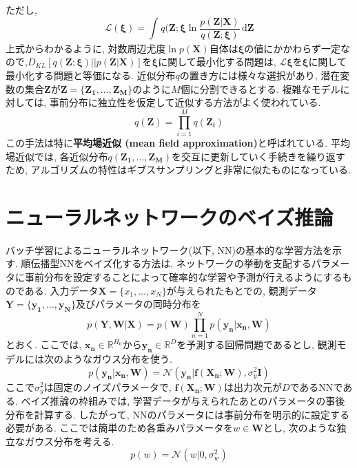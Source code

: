 \documentclass[twocolumn]{jarticle}
\begin{document}
ただし,
\begin{equation}
  \mathcal{L}(\bm {\xi}) = \int_{}^{} q(\bm {Z;\xi}\ln\frac{p(\bm {Z|X})}{q(\bm {Z;\xi})} \,\mathrm{d}{\bm {Z}}
\end{equation}
上式からわかるように, 対数周辺尤度${\ln p(\bm {X})}$自体は${\bm {\xi}}$の値にかかわらず一定なので,${D_{KL}[q(\bm {Z;\xi})||p(\bm {Z|X})]}$を${\bm {\xi}}$に関して最小化する問題は, ${\mathcal{L} {\bm {\xi}}}$を${\bm {\xi}}$に関して最小化する問題と等価になる. 近似分布${q}$の置き方には様々な選択があり, 潜在変数の集合${\bm {Z}}$が${\bm {Z} = \{ \bm{Z_1, \ldots, Z_M}\}}$のように${M}$個に分割できるとする. 複雑なモデルに対しては, 事前分布に独立性を仮定して近似する方法がよく使われている.
\begin{equation}
  q(\bm {Z}) = \prod_{i=1}^{M} q(\bm {Z_i})
\end{equation}
この手法は特に{\bf 平均場近似 (mean field approximation)}と呼ばれている. 平均場近似では, 各近似分布${q(\bm {Z_1}, \ldots, \bm {Z_M})}$を交互に更新していく手続きを繰り返すため, アルゴリズムの特性はギブスサンプリングと非常に似たものになっている.

\section{ニューラルネットワークのベイズ推論}
バッチ学習によるニューラルネットワーク(以下, NN)の基本的な学習方法を示す. 順伝播型NNをベイズ化する方法は, ネットワークの挙動を支配するパラメータに事前分布を設定することによって確率的な学習や予測が行えるようにするものである.
入力データ${\bm {X} = \{x_1, \ldots, x_N\}}$が与えられたもとでの, 観測データ${\bm {Y} = \{\bm {y_1, \ldots, y_N}\}}$及びパラメータの同時分布を
\begin{equation}
  p(\bm {Y, W| X}) = p(\bm {W})\prod_{n=1}^{N} p(\bm {y_n|x_n, W})
\end{equation}
とおく. ここでは, ${\bm {x_n} \in \mathbb{R}^{H_0}}$から${\bm {y_n} \in \mathbb{R}^{D}}$を予測する回帰問題であるとし, 観測モデルには次のようなガウス分布を使う.
\begin{equation}
  p(\bm {y_n | x_n, W}) = \mathcal{N} (\bm {y_n|f(X_n;W)}, \sigma_y^2 \bm {I})
\end{equation}
ここで${\sigma_y^2}$は固定のノイズパラメータで, ${\bm {f(X_n;W)}}$は出力次元が${D}$であるNNである. ベイズ推論の枠組みでは, 学習データが与えられたあとのパラメータの事後分布を計算する. したがって, NNのパラメータには事前分布を明示的に設定する必要がある. ここでは簡単のため各重みパラメータを${w \in \bm {W}}$とし, 次のような独立なガウス分布を考える.
\begin{equation}
  p(w) = \mathcal{N}(w|0, \sigma_w^2)
\end{equation}
\end{document}
